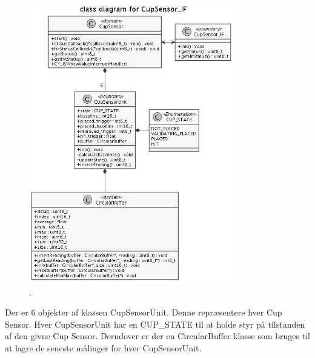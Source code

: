 \documentclass[Rapport/Rapport_main.tex]{subfiles}
\begin{document}
\begin{figure}[H]
    \centering
    \includegraphics[width=0.8\textwidth]{Softwaredesign/CupSensor_IF/graphics/classDiagram.png}
    \caption{.}
    \label{fig:CupSensor-IF-classDiagram}
\end{figure}

Der er 6 objekter af klassen CupSensorUnit. Denne repræsentere hver Cup Sensor. Hver CupSensorUnit har en CUP\_STATE til at holde styr på tilstanden af den givne Cup Sensor. Derudover er der en CircularBuffer klasse som bruges til at lagre de seneste målinger for hver CupSensorUnit.
\end{document}
